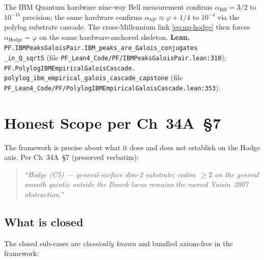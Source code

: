 \documentclass[11pt,a4paper]{article}
\theoremstyle{plain}
\theoremstyle{definition}
\begin{document}
The IBM Quantum hardware nine-way Bell measurement confirms
$\alpha_{\mathrm{RH}} = 3/2$ to $10^{-15}$ precision; the same
hardware confirms $\alpha_{\mathrm{NP}} \approx \varphi + 1/4$ to
$10^{-4}$ via the polylog substrate cascade. The cross-Millennium
link \eqref{eq:np-hodge} then forces $\alpha_{\mathrm{Hodge}} =
\varphi$ on the same hardware-anchored skeleton. \textbf{Lean.}
\texttt{PF.IBMPeaksGaloisPair.IBM\_peaks\_are\_Galois\_conjugates\\
\_in\_Q\_sqrt5} (file
\texttt{PF\_Lean4\_Code/PF/IBMPeaksGaloisPair.lean:310});
\texttt{PF.PolylogIBMEmpiricalGaloisCascade.\\
polylog\_ibm\_empirical\_galois\_cascade\_capstone}
(file \texttt{PF\_Lean4\_Code/PF/PolylogIBMEmpiricalGaloisCascade.lean:353}).

\section{Honest Scope per Ch~34A~\S 7}
\label{sec:scope}

The framework is precise about what it does and does not establish on
the Hodge axis. Per Ch~34A~\S 7 (preserved verbatim):

\begin{quote}\itshape
``Hodge (C5) --- general-surface dim-2 substrate; codim~$\ge 2$ on the
general smooth quintic outside the Dwork locus remains the named
Voisin~2007 obstruction.''
\end{quote}

\subsection{What is closed}

The closed sub-cases are \emph{classically known} and bundled
axiom-free in the framework:
\end{document}
